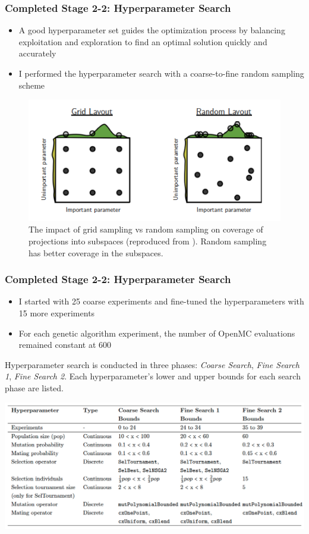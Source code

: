 \begin{frame}
    \frametitle{Completed Stage 2-2: Hyperparameter Search}
    \begin{itemize}
        \item A good hyperparameter set guides the optimization process by 
        balancing exploitation and exploration to find an optimal solution quickly 
        and accurately
        \item I performed the hyperparameter search with a coarse-to-fine random 
        sampling scheme
    \end{itemize}
    \begin{figure}[]
        \centering
        \includegraphics[width=0.5\linewidth]{../docs/figures/random_vs_grid_sampling.png} 
        \caption{The impact of grid sampling vs random sampling on coverage of projections 
        into subspaces (reproduced from \cite{jordan_hyperparameter_2017}). 
        Random sampling has better coverage in the subspaces.}
    \end{figure}
\end{frame}

\begin{frame}
    \frametitle{Completed Stage 2-2: Hyperparameter Search}
    \begin{itemize}
        \item I started with 25 coarse experiments and fine-tuned the hyperparameters
        with 15 more experiments
        \item For each genetic algorithm experiment, the number 
        of OpenMC evaluations remained constant at 600
    \end{itemize}
    \begin{table}
        \caption{Hyperparameter search is conducted in three phases: \textit{Coarse Search}, 
    \textit{Fine Search 1}, \textit{Fine Search 2}. Each hyperparameter's lower and
    upper bounds for each search phase are listed.}
        \includegraphics[width=0.8\linewidth]{figures/hyperparameter-search.png} 
    \end{table}
\end{frame}

